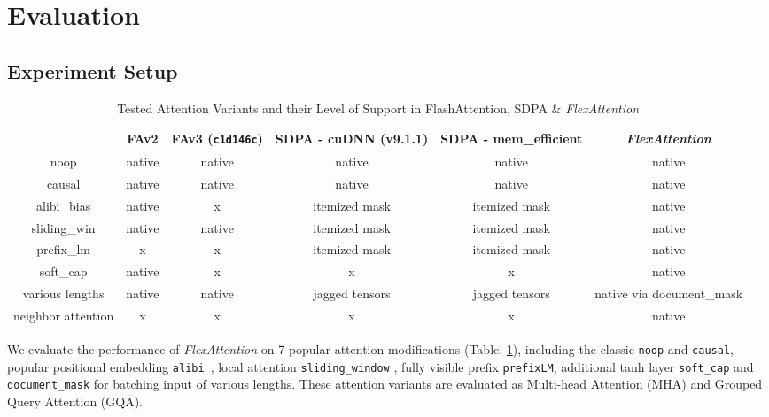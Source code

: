 \section{Evaluation}


\subsection{Experiment Setup}\begin{table}[!ht]
 \small
    \centering
    \begin{tabular}{|c||c|c|c|c|c|} \hline 
          &  FAv2 & FAv3 ({\tt c1d146c}) & SDPA - cuDNN (v9.1.1)  &  SDPA - mem\_efficient & \textit{FlexAttention} \\ \hline \hline
         noop & native & native & native & native & native\\ \hline 
         causal &  native& native &  native& native & native\\ \hline 
         alibi\_bias&  native& x &  itemized mask& itemized mask & native\\ \hline 
         sliding\_win & native &  native &itemized mask & itemized mask & native \\ \hline
         prefix\_lm&  x& x &  itemized mask& itemized mask & native\\ \hline 
         soft\_cap&  native& x &  x& x & native\\ \hline 
         various lengths &  native& native &  jagged tensors& jagged tensors & native via document\_mask\\ \hline
         neighbor attention & x & x & x & x & native \\ \hline
    \end{tabular}
    \caption{Tested Attention Variants and their Level of Support in FlashAttention, SDPA \& \textit{FlexAttention}}
    \label{tab:evaluation:mods}
\end{table} 

We evaluate the performance of \textit{FlexAttention} on 7 popular attention modifications (Table. \ref{tab:evaluation:mods}), including the classic {\tt noop} and {\tt causal}, popular positional embedding {\tt alibi}~\cite{alibi}, local attention {\tt sliding\_window} \cite{longformer}, fully visible prefix {\tt prefixLM}, additional tanh layer {\tt soft\_cap} and {\tt document\_mask} for batching input of various lengths. These attention variants are evaluated as Multi-head Attention (MHA) and Grouped Query Attention (GQA). 



